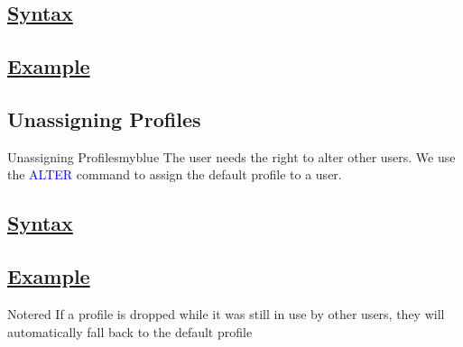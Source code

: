 \vspace{0.15cm}
\subsection*{\underline{Syntax}} 


\vspace{0.15cm}
\subsection*{\underline{Example}} 




\vspace{0.25cm}
\subsection{Unassigning Profiles} 
\begin{prettyBox}{Unassigning Profiles}{myblue}
The user needs the right to alter other users. We use the
\textcolor{blue}{ALTER} command to assign the default profile to a user. 
\end{prettyBox}

\vspace{0.15cm}
\subsection*{\underline{Syntax}} 


\vspace{0.15cm}
\subsection*{\underline{Example}} 


\vspace{0.45cm}

\begin{prettyBox}{Note}{red}
If a profile is dropped while it was still in use by other users, they will automatically
fall back to the default profile
\end{prettyBox}


